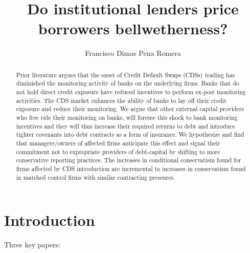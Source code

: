 \documentclass[english, 3p]{elsarticle}
\begin{document}
\title{Do institutional lenders price borrowers bellwetherness?}



\author{Francisco Dimas Pena Romera}

\address{Accounting PhD Student}
\address{Kenan-Flagler Business School, University of North Carolina, Chapel Hill, NC 27599-3490, USA}
\address{Jeffs Seminar 2015 - Research proposal}



\pagebreak


\begin{abstract}
	Prior literature argues that the onset of Credit Default Swaps (CDSs)
	trading has diminished the monitoring activity of banks on the underlying
	firms. Banks that do not hold direct credit exposure have reduced
	incentives to perform ex-post monitoring activities. The CDS market
	enhances the ability of banks to lay off their credit exposure and
	reduce their monitoring. We argue that other external capital providers
	who free ride their monitoring on banks, will foresee this shock to
	bank monitoring incentives and they will thus increase their required
	returns to debt and introduce tighter covenants into debt contracts
	as a form of insurance. We hypothesize and find that managers/owners of affected
	firms anticipate this effect and signal their commitment not
	to expropriate providers of debt-capital by shifting to more conservative
	reporting practices. The increases in conditional conservatism found for firms affected by CDS introduction are incremental to increases in conservatism found in matched control firms with similar contracting pressures. 
\end{abstract}



\maketitle

 

\section{Introduction} 


Three key papers:
\end{document}
